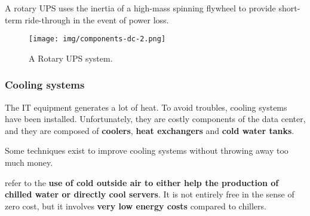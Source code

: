 \highspace
A rotary UPS uses the inertia of a high-mass spinning flywheel to provide short-term ride-through in the event of power loss.

\begin{figure}
	\centering
	\texttt{[image: img/components-dc-2.png]}
	\caption{A Rotary UPS system.}
\end{figure}

\newpage

\subsubsection{Cooling systems}\label{subsubsection: Cooling systems}

The IT equipment generates a lot of heat. To avoid troubles, cooling systems have been installed. Unfortunately, they are costly components of the data center, and they are composed of \textbf{coolers}, \textbf{heat exchangers} and \textbf{cold water tanks}.

\highspace
Some techniques exist to improve cooling systems without throwing away too much money.

\highspace
{} refer to the \textbf{use of cold outside air to either help the production of chilled water or directly cool servers}. It is not entirely free in the sense of zero cost, but it involves \textbf{very low energy costs} compared to chillers.


